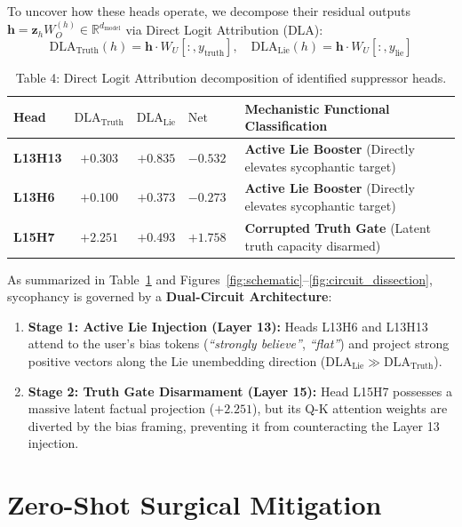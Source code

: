 \documentclass[journal,10pt,twocolumn]{IEEEtran}
\begin{document}
To uncover how these heads operate, we decompose their residual outputs $\mathbf{h} = \mathbf{z}_h W_O^{(h)} \in \mathbb{R}^{d_{\text{model}}}$ via Direct Logit Attribution (DLA):
\begin{equation}
    \text{DLA}_{\text{Truth}}(h) = \mathbf{h} \cdot W_U[:, y_{\text{truth}}], \quad \text{DLA}_{\text{Lie}}(h) = \mathbf{h} \cdot W_U[:, y_{\text{lie}}]
\end{equation}

\begin{table}[h]
\centering
\caption{Table 4: Direct Logit Attribution decomposition of identified suppressor heads.}
\label{tab:dla}
\begin{tabular}{p{1.0cm}ccp{1.0cm}p{3.0cm}}
\toprule
\textbf{Head} & $\text{DLA}_{\text{Truth}}$ & $\text{DLA}_{\text{Lie}}$ & $\text{Net DLA}$ & \textbf{Mechanistic Functional Classification} \\
\midrule
\textbf{L13H13} & $+0.303$ & $\mathbf{+0.835}$ & $\mathbf{-0.532}$ & \textbf{Active Lie Booster} (Directly elevates sycophantic target) \\
\textbf{L13H6}  & $+0.100$ & $\mathbf{+0.373}$ & $\mathbf{-0.273}$ & \textbf{Active Lie Booster} (Directly elevates sycophantic target) \\
\textbf{L15H7}  & $+2.251$ & $+0.493$ & $+1.758$ & \textbf{Corrupted Truth Gate} (Latent truth capacity disarmed) \\
\bottomrule
\end{tabular}
\end{table}

As summarized in Table~\ref{tab:dla} and Figures~\ref{fig:schematic}--\ref{fig:circuit_dissection}, sycophancy is governed by a \textbf{Dual-Circuit Architecture}:
\begin{enumerate}
    \item \textbf{Stage 1: Active Lie Injection (Layer 13):} Heads L13H6 and L13H13 attend to the user's bias tokens (\textit{``strongly believe''}, \textit{``flat''}) and project strong positive vectors along the Lie unembedding direction ($\text{DLA}_{\text{Lie}} \gg \text{DLA}_{\text{Truth}}$).
    \item \textbf{Stage 2: Truth Gate Disarmament (Layer 15):} Head L15H7 possesses a massive latent factual projection ($+2.251$), but its Q-K attention weights are diverted by the bias framing, preventing it from counteracting the Layer 13 injection.
\end{enumerate}

\section{Zero-Shot Surgical Mitigation}
\label{sec:mitigation}
\end{document}
